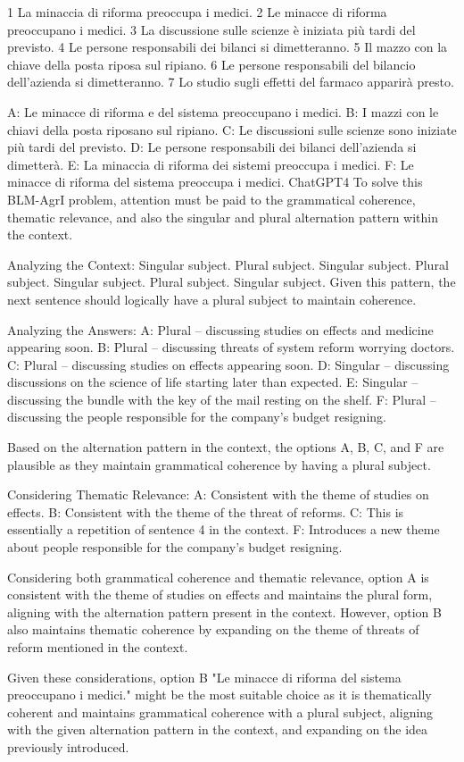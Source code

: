 1 La minaccia di riforma preoccupa i medici.
2 Le minacce di riforma preoccupano i medici.
3 La discussione sulle scienze è iniziata più tardi del previsto.
4 Le persone responsabili dei bilanci si dimetteranno.
5 Il mazzo con la chiave della posta riposa sul ripiano.
6 Le persone responsabili del bilancio dell'azienda si dimetteranno.
7 Lo studio sugli effetti del farmaco apparirà presto.

A: Le minacce di riforma e del sistema preoccupano i medici.
B: I mazzi con le chiavi della posta riposano sul ripiano.
C: Le discussioni sulle scienze sono iniziate più tardi del previsto.
D: Le persone responsabili dei bilanci dell'azienda si dimetterà.
E: La minaccia di riforma dei sistemi preoccupa i medici.
F: Le minacce di riforma del sistema preoccupa i medici.
ChatGPT4
To solve this BLM-AgrI problem, attention must be paid to the grammatical coherence, thematic relevance, and also the singular and plural alternation pattern within the context.

Analyzing the Context:
Singular subject.
Plural subject.
Singular subject.
Plural subject.
Singular subject.
Plural subject.
Singular subject.
Given this pattern, the next sentence should logically have a plural subject to maintain coherence.

Analyzing the Answers:
A: Plural – discussing studies on effects and medicine appearing soon.
B: Plural – discussing threats of system reform worrying doctors.
C: Plural – discussing studies on effects appearing soon.
D: Singular – discussing discussions on the science of life starting later than expected.
E: Singular – discussing the bundle with the key of the mail resting on the shelf.
F: Plural – discussing the people responsible for the company’s budget resigning.

Based on the alternation pattern in the context, the options A, B, C, and F are plausible as they maintain grammatical coherence by having a plural subject.

Considering Thematic Relevance:
A: Consistent with the theme of studies on effects.
B: Consistent with the theme of the threat of reforms.
C: This is essentially a repetition of sentence 4 in the context.
F: Introduces a new theme about people responsible for the company’s budget resigning.

Considering both grammatical coherence and thematic relevance, option A is consistent with the theme of studies on effects and maintains the plural form, aligning with the alternation pattern present in the context. However, option B also maintains thematic coherence by expanding on the theme of threats of reform mentioned in the context.

Given these considerations, option B "Le minacce di riforma del sistema preoccupano i medici." might be the most suitable choice as it is thematically coherent and maintains grammatical coherence with a plural subject, aligning with the given alternation pattern in the context, and expanding on the idea previously introduced.

